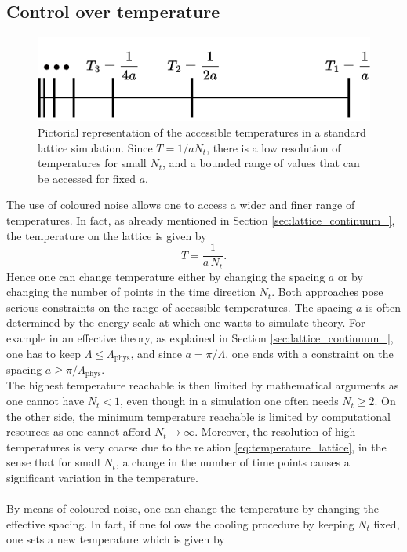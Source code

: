 \subsection{Control over temperature}
\begin{figure}[b]
    \centering 
    \includegraphics[width=0.6\linewidth]{figures/temperatures.pdf}
    \caption[Temperatures on the lattice]{Pictorial representation of the accessible temperatures in a standard lattice simulation. Since $T = 1/aN_t$, there is a low resolution of temperatures for small $N_t$, and a bounded range of values that can be accessed for fixed $a$.}
    \label{fig:temperatures_lattice}
\end{figure}
The use of coloured noise allows one to access a wider and finer range of temperatures. In fact, as already mentioned in Section \ref{sec:lattice_continuum_}, the temperature on the lattice is given by 
\begin{equation}
    T = \frac{1}{a \, N_t}.
    \label{eq:temperature_lattice}
\end{equation}
Hence one can change temperature either by changing the spacing $a$ or by changing the number of points in the time direction $N_t$. 
Both approaches pose serious constraints on the range of accessible temperatures. The spacing $a$ is often determined by the energy scale at which one wants to simulate theory. 
For example in an effective theory, as explained in Section \ref{sec:lattice_continuum_}, one has to keep $\Lambda \leq \Lambda_\text{phys}$, and since $a = \pi/\Lambda$, one ends with a constraint on the spacing $a \geq \pi/\Lambda_\text{phys}$. \\
The highest temperature reachable is then limited by mathematical arguments as one cannot have $N_t < 1$, even though in a simulation one often needs $N_t \geq 2$. On the other side, the minimum temperature reachable is limited by computational resources as one cannot afford $N_t \to \infty$.
Moreover, the resolution of high temperatures is very coarse due to the relation \eqref{eq:temperature_lattice}, in the sense that for small $N_t$, a change in the number of time points causes a significant variation in the temperature. \\~\\
By means of coloured noise, one can change the temperature by changing the effective spacing. In fact, if one follows the cooling procedure by keeping $N_t$ fixed, one sets a new temperature which is given by 
